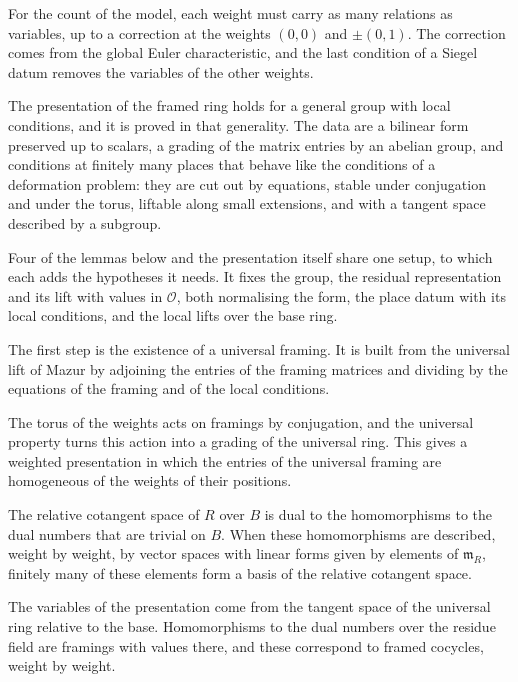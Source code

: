 For the count of the model, each weight must carry as many relations as variables, up to a correction at the weights $(0,0)$ and $\pm(0,1)$. The correction comes from the global Euler characteristic, and the last condition of a Siegel datum removes the variables of the other weights.

The presentation of the framed ring holds for a general group with local conditions, and it is proved in that generality. The data are a bilinear form preserved up to scalars, a grading of the matrix entries by an abelian group, and conditions at finitely many places that behave like the conditions of a deformation problem: they are cut out by equations, stable under conjugation and under the torus, liftable along small extensions, and with a tangent space described by a subgroup.

Four of the lemmas below and the presentation itself share one setup, to which each adds the hypotheses it needs. It fixes the group, the residual representation and its lift with values in $\mathcal O$, both normalising the form, the place datum with its local conditions, and the local lifts over the base ring.

The first step is the existence of a universal framing. It is built from the universal lift of Mazur by adjoining the entries of the framing matrices and dividing by the equations of the framing and of the local conditions.

The torus of the weights acts on framings by conjugation, and the universal property turns this action into a grading of the universal ring. This gives a weighted presentation in which the entries of the universal framing are homogeneous of the weights of their positions.

The relative cotangent space of $R$ over $B$ is dual to the homomorphisms to the dual numbers that are trivial on $B$. When these homomorphisms are described, weight by weight, by vector spaces with linear forms given by elements of $\mathfrak m_R$, finitely many of these elements form a basis of the relative cotangent space.

The variables of the presentation come from the tangent space of the universal ring relative to the base. Homomorphisms to the dual numbers over the residue field are framings with values there, and these correspond to framed cocycles, weight by weight.

